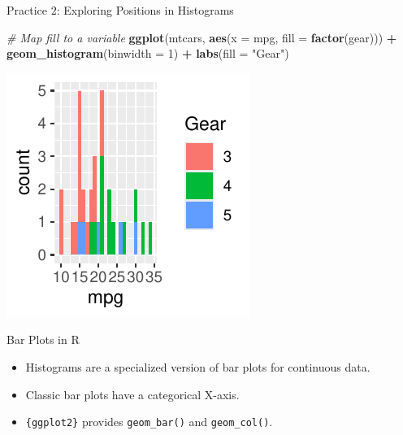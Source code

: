\documentclass[
  ignorenonframetext,
]{beamer}
\newenvironment{Shaded}{\begin{snugshade}}{\end{snugshade}}
\newcommand{\AttributeTok}[1]{\textcolor[rgb]{0.13,0.29,0.53}{#1}}
\newcommand{\CommentTok}[1]{\textcolor[rgb]{0.56,0.35,0.01}{\textit{#1}}}
\newcommand{\DecValTok}[1]{\textcolor[rgb]{0.00,0.00,0.81}{#1}}
\newcommand{\FunctionTok}[1]{\textcolor[rgb]{0.13,0.29,0.53}{\textbf{#1}}}
\newcommand{\NormalTok}[1]{#1}
\newcommand{\SpecialCharTok}[1]{\textcolor[rgb]{0.81,0.36,0.00}{\textbf{#1}}}
\newcommand{\StringTok}[1]{\textcolor[rgb]{0.31,0.60,0.02}{#1}}
\providecommand{\tightlist}{%
  \setlength{\itemsep}{0pt}\setlength{\parskip}{0pt}}
\begin{document}
\begin{frame}[fragile]{Practice 2: Exploring Positions in Histograms}
\label{practice-2-exploring-positions-in-histograms-1}

\begin{Shaded}
\begin{Highlighting}[]
\CommentTok{\# Map fill to a variable}
\FunctionTok{ggplot}\NormalTok{(mtcars, }\FunctionTok{aes}\NormalTok{(}\AttributeTok{x =}\NormalTok{ mpg, }\AttributeTok{fill =} \FunctionTok{factor}\NormalTok{(gear))) }\SpecialCharTok{+} \FunctionTok{geom\_histogram}\NormalTok{(}\AttributeTok{binwidth =} \DecValTok{1}\NormalTok{) }\SpecialCharTok{+}
    \FunctionTok{labs}\NormalTok{(}\AttributeTok{fill =} \StringTok{"Gear"}\NormalTok{)}
\end{Highlighting}
\end{Shaded}

\begin{center}\includegraphics[width=0.5\linewidth]{Figs/unnamed-chunk-41-1} \end{center}
\end{frame}

\begin{frame}[fragile]{Bar Plots in R}
\label{bar-plots-in-r}
\begin{itemize}
\tightlist
\item
  Histograms are a specialized version of bar plots for continuous data.
\item
  Classic bar plots have a categorical X-axis.
\item
  \texttt{\{ggplot2\}} provides \texttt{geom\_bar()} and
  \texttt{geom\_col()}.
\end{itemize}
\end{frame}
\end{document}
